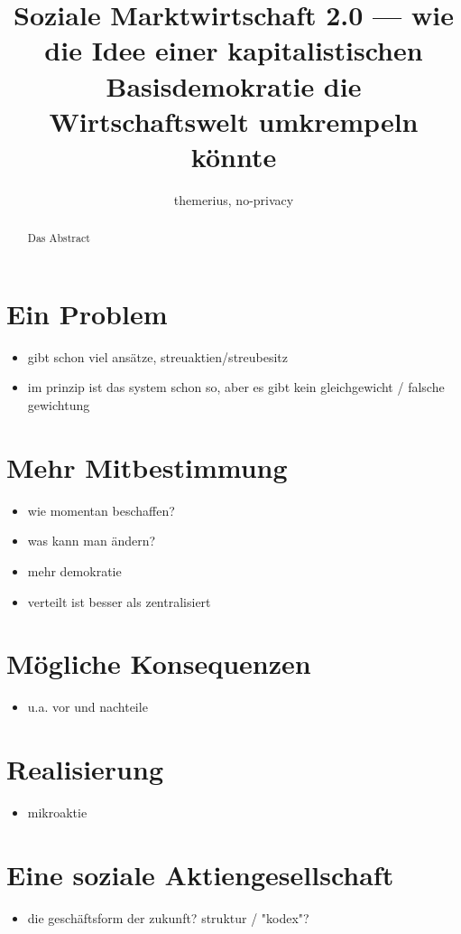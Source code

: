 \documentclass[a4paper, 10pt, twocolumn]{article}
\begin{document}
\author{themerius, no-privacy} 
\title{Soziale Marktwirtschaft 2.0 — wie die Idee einer
kapitalistischen Basisdemokratie die
Wirtschaftswelt umkrempeln könnte}
\maketitle

\begin{abstract}
Das Abstract
\end{abstract}

\section{Ein Problem}
\begin{itemize}
    \item gibt schon viel ansätze, streuaktien/streubesitz
    \item im prinzip ist das system schon so, aber es gibt kein
          gleichgewicht / falsche gewichtung
\end{itemize}

\section{Mehr Mitbestimmung}
\begin{itemize}
    \item wie momentan beschaffen?
    \item was kann man ändern?
    \item mehr demokratie
    \item verteilt ist besser als zentralisiert
\end{itemize}

\section{Mögliche Konsequenzen}
\begin{itemize}
    \item u.a. vor und nachteile
\end{itemize}

\section{Realisierung}
\begin{itemize}
    \item mikroaktie
\end{itemize}

\section{Eine soziale Aktiengesellschaft}
\begin{itemize}
    \item die geschäftsform der zukunft? struktur / "kodex"?
\end{itemize}
\end{document}
